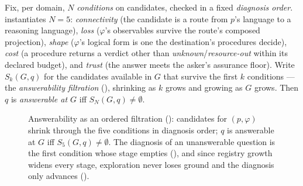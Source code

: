 \begin{definition}[Answerability]
\label{def:answerable}
Fix, per domain, $N$ \emph{conditions} on candidates, checked in a
fixed \emph{diagnosis order}. \hg{} instantiates $N = 5$:
\emph{connectivity} (the candidate is a route from $p$'s language to
a reasoning language), \emph{loss} ($\varphi$'s observables survive
the route's composed projection), \emph{shape} ($\varphi$'s logical
form is one the destination's procedures decide), \emph{cost} (a
procedure returns a verdict other than
\textit{unknown}/\textit{resource-out} within its declared budget),
and \emph{trust} (the answer meets the asker's assurance floor).
Write $S_k(G, q)$ for the candidates available in $G$ that survive
the first $k$ conditions --- the \emph{answerability filtration}
(), shrinking as $k$ grows and growing as $G$
grows. Then $q$ is \emph{answerable at $G$} iff
$S_N(G, q) \neq \emptyset$.
\end{definition}

\begin{figure}
\centering
{}
\caption{Answerability as an ordered filtration
(): candidates for $(p,\varphi)$ shrink through
the five conditions in diagnosis order; $q$ is answerable at $G$ iff
$S_5(G,q) \neq \emptyset$. The diagnosis of an unanswerable question
is the first condition whose stage empties
(), and since registry growth widens every
stage, exploration never loses ground and the diagnosis only
advances ().}
\label{fig:filtration}
\end{figure}

